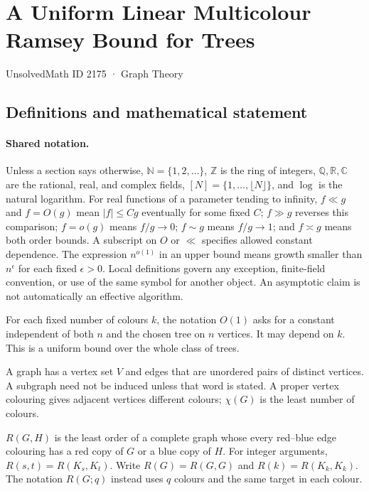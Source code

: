 \documentclass[11pt,a4paper]{article}
\newcommand{\N}{\mathbb{N}}
\newcommand{\Z}{\mathbb{Z}}
\newcommand{\Q}{\mathbb{Q}}
\newcommand{\R}{\mathbb{R}}
\newcommand{\C}{\mathbb{C}}
\begin{document}

\setcounter{section}{2174}

\section{A Uniform Linear Multicolour Ramsey Bound for Trees}\label{2175}

{\small\sffamily UnsolvedMath ID 2175 · Graph Theory}

\subsection{Definitions and mathematical statement}

\paragraph{Shared notation.}Unless a section says otherwise, $\N=\{1,2,\ldots\}$,
$\Z$ is the ring of integers, $\Q,\R,\C$ are the rational, real, and complex
fields, $[N]=\{1,\ldots,\lfloor N\rfloor\}$, and $\log$ is the natural
logarithm. For real functions of a parameter tending to infinity,
$f\ll g$ and $f=O(g)$ mean $|f|\leq Cg$ eventually for some fixed $C$;
$f\gg g$ reverses this comparison; $f=o(g)$ means $f/g\to0$;
$f\sim g$ means $f/g\to1$; and $f\asymp g$ means both order bounds.
A subscript on $O$ or $\ll$ specifies allowed constant dependence.
The expression $n^{o(1)}$ in an upper bound means growth smaller than
$n^\epsilon$ for each fixed $\epsilon>0$. Local definitions govern any
exception, finite-field convention, or use of the same symbol for another
object. An asymptotic claim is not automatically an effective algorithm.



For each fixed number of colours $k$, the notation $O(1)$ asks for a constant independent of both $n$ and the chosen tree on $n$ vertices. It may depend on $k$. This is a uniform bound over the whole class of trees.

A graph has a vertex set $V$ and edges that are unordered pairs of distinct vertices. A subgraph need not be induced unless that word is stated. A proper vertex colouring gives adjacent vertices different colours; $\chi(G)$ is the least number of colours.

$R(G,H)$ is the least order of a complete graph whose every red--blue edge colouring has a red copy of $G$ or a blue copy of $H$. For integer arguments, $R(s,t)=R(K_s,K_t)$. Write $R(G)=R(G,G)$ and $R(k)=R(K_k,K_k)$. The notation $R(G;q)$ instead uses $q$ colours and the same target in each colour.
\end{document}
